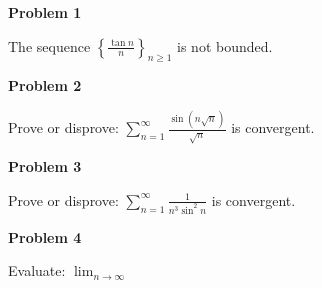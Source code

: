\documentclass{article}
\begin{document}
\begin{center}
    \textbf{Problem 1}
\end{center}
\begin{problem}{}
    The sequence $\displaystyle \left\{ \frac{\tan n}{n} \right\}_{n \geq 1}$ is not bounded. 
\end{problem}

\vspace{.5cm}
\begin{center}
    \textbf{Problem 2}
\end{center}
\begin{problem}{}
    Prove or disprove: $\displaystyle \sum_{n = 1}^\infty \frac{\sin (n \sqrt{n})}{\sqrt{n}}$ is convergent. 
\end{problem}

\vspace{.5cm}
\begin{center}
    \textbf{Problem 3}
\end{center}
\begin{problem}{}
    Prove or disprove: $\displaystyle \sum_{n = 1}^\infty \frac{1}{n^3 \sin^2 n}$ is convergent. 
\end{problem}

\vspace{.5cm}
\begin{center}
    \textbf{Problem 4}
\end{center}
\begin{problem}{}
    Evaluate: $\displaystyle \lim_{n \to \infty }$
\end{problem}
\end{document}
